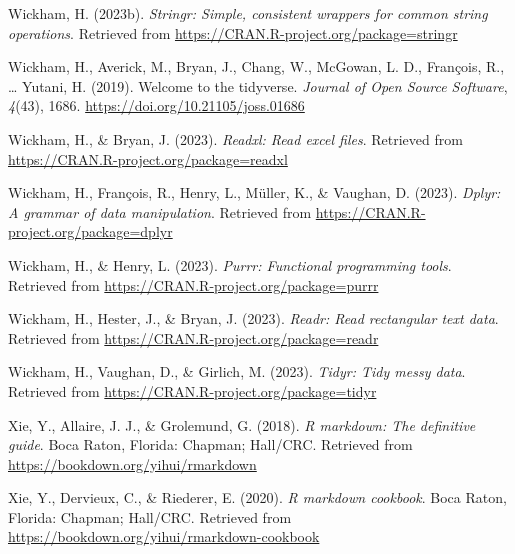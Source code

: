 \documentclass[
  man,floatsintext]{apa6}
\newlength{\cslhangindent}
\newlength{\cslentryspacingunit} %
\newenvironment{CSLReferences}[2] %
 {%
  \setlength{\parindent}{0pt}
  \ifodd #1
  \let\oldpar\par
  \def\par{\hangindent=\cslhangindent\oldpar}
  \fi
  \setlength{\parskip}{#2\cslentryspacingunit}
 }%
 {}
\begin{document}
\begin{CSLReferences}{1}{0}
\leavevmode{}%
Wickham, H. (2023b). \emph{Stringr: Simple, consistent wrappers for common string operations}. Retrieved from \url{https://CRAN.R-project.org/package=stringr}

\leavevmode{}%
Wickham, H., Averick, M., Bryan, J., Chang, W., McGowan, L. D., François, R., \ldots{} Yutani, H. (2019). Welcome to the {tidyverse}. \emph{Journal of Open Source Software}, \emph{4}(43), 1686. \url{https://doi.org/10.21105/joss.01686}

\leavevmode{}%
Wickham, H., \& Bryan, J. (2023). \emph{Readxl: Read excel files}. Retrieved from \url{https://CRAN.R-project.org/package=readxl}

\leavevmode{}%
Wickham, H., François, R., Henry, L., Müller, K., \& Vaughan, D. (2023). \emph{Dplyr: A grammar of data manipulation}. Retrieved from \url{https://CRAN.R-project.org/package=dplyr}

\leavevmode{}%
Wickham, H., \& Henry, L. (2023). \emph{Purrr: Functional programming tools}. Retrieved from \url{https://CRAN.R-project.org/package=purrr}

\leavevmode{}%
Wickham, H., Hester, J., \& Bryan, J. (2023). \emph{Readr: Read rectangular text data}. Retrieved from \url{https://CRAN.R-project.org/package=readr}

\leavevmode{}%
Wickham, H., Vaughan, D., \& Girlich, M. (2023). \emph{Tidyr: Tidy messy data}. Retrieved from \url{https://CRAN.R-project.org/package=tidyr}

\leavevmode{}%
Xie, Y., Allaire, J. J., \& Grolemund, G. (2018). \emph{R markdown: The definitive guide}. Boca Raton, Florida: Chapman; Hall/CRC. Retrieved from \url{https://bookdown.org/yihui/rmarkdown}

\leavevmode{}%
Xie, Y., Dervieux, C., \& Riederer, E. (2020). \emph{R markdown cookbook}. Boca Raton, Florida: Chapman; Hall/CRC. Retrieved from \url{https://bookdown.org/yihui/rmarkdown-cookbook}

\end{CSLReferences}
\end{document}
